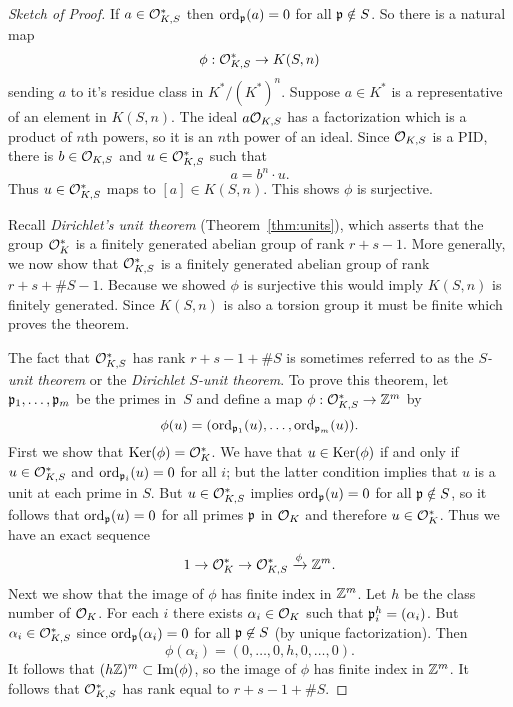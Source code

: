\begin{proof}[Sketch of Proof]
	If $a \in \mathcal{O}_{K,S}^*$ then $\operatorname{ord}_{\mathfrak{p}}(a)=0$ for all $\mathfrak{p}\notin S$.
	So there is a natural map
	$$
		\phi: \mathcal{O}_{K,S}^* \to K(S,n)
	$$
	sending $a$ to it's residue class in $K^*/(K^*)^n$.
	Suppose $a\in K^*$ is a representative of an element in $K(S,n)$.
	The ideal $a \mathcal{O}_{K,S}$ has a factorization which is a product of $n$th
	powers, so it is an $n$th power of an ideal. Since $\mathcal{O}_{K,S}$ is a PID,
	there is $b\in \mathcal{O}_{K,S}$ and $u\in \mathcal{O}_{K,S}^*$ such that
	$$
		a = b^n \cdot u.
	$$
	Thus $u\in \mathcal{O}_{K,S}^*$ maps to $[a] \in K(S,n)$. This shows $\phi$
	is surjective.
	
	Recall {\em Dirichlet's unit theorem} (Theorem~\ref{thm:units}),
	which asserts that the group $\mathcal{O}_K^*$ is a finitely generated
	abelian group of rank $r+s-1$.  More generally, we
	now show that $\mathcal{O}_{K,S}^*$ is a finitely generated abelian group of
	rank $r+s+\#S -1$.
	Because we showed $\phi$ is surjective this would imply $K(S,n)$ is finitely generated. Since $K(S,n)$ is also a torsion group it must be finite which proves the theorem.
	
	The fact that $\mathcal{O}_{K,S}^*$ has rank $r+s-1 + \#S$ is sometimes
	referred to as the \emph{$S$-unit theorem} or the
	\emph{Dirichlet $S$-unit theorem}. To prove this theorem,
	let $\mathfrak{p}_1,\ldots, \mathfrak{p}_m$ be the primes in~$S$
	and define a map $\phi: \mathcal{O}_{K,S}^* \to \mathbb{Z}^m$ by
	$$
		\phi(u) = (\operatorname{ord}_{\mathfrak{p}_1}(u), \ldots, \operatorname{ord}_{\mathfrak{p}_m}(u)).
	$$
	First we show that $\operatorname{Ker}(\phi) = \mathcal{O}_K^*$.  We have that
	$u\in \operatorname{Ker}(\phi)$ if and only if $u \in \mathcal{O}_{K,S}^*$
	and $\operatorname{ord}_{\mathfrak{p}_i}(u) = 0$ for all $i$; but the latter condition
	implies that $u$ is a unit at each prime in $S$. But
	$u\in \mathcal{O}_{K,S}^*$ implies $\operatorname{ord}_{\mathfrak{p}}(u) = 0$ for all $\mathfrak{p}\notin S$,
	so it follows that $\operatorname{ord}_{\mathfrak{p}}(u)=0$ for all primes $\mathfrak{p}$ in $\mathcal{O}_K$
	and therefore $u\in \mathcal{O}_K^*$.
	Thus we have an exact sequence
	$$
		1 \to \mathcal{O}_K^* \to \mathcal{O}_{K,S}^* \xrightarrow{\phi} \mathbb{Z}^m.
	$$
	Next we show that the image of $\phi$ has finite index
	in $\mathbb{Z}^m$.  Let $h$ be the class number of $\mathcal{O}_K$.
	For each $i$ there exists $\alpha_i \in \mathcal{O}_K$
	such that $\mathfrak{p}_i^h = (\alpha_i)$.  But $\alpha_i \in \mathcal{O}_{K,S}^*$
	since $\operatorname{ord}_{\mathfrak{p}}(\alpha_i) = 0$ for all $\mathfrak{p}\not\in S$ (by unique
	factorization). Then
	$$
		\phi(\alpha_i) = (0,\ldots, 0, h, 0,\ldots, 0).
	$$
	It follows that $(h\mathbb{Z})^m \subset \text{Im}(\phi)$, so
	the image of $\phi$ has finite index in $\mathbb{Z}^m$.  It follows
	that $\mathcal{O}_{K,S}^*$ has rank equal to $r+s-1+\#S$.
\end{proof}


